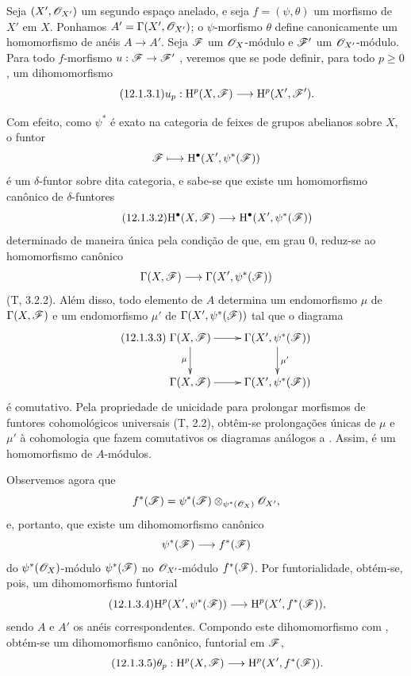 \begin{env}[12.1.3]
\label{0.12.1.3}
Seja $(X',\mathscr{O}_{X'})$ um segundo espaço anelado, e seja
$f=(\psi,\theta)$ um morfismo de $X'$ em $X$.
Ponhamos $A'=\Gamma(X',\mathscr{O}_{X'})$; o $\psi$-morfismo $\theta$
define canonicamente um homomorfismo de anéis $A\to A'$.
Seja $\mathscr{F}$ um $\mathscr{O}_X$-módulo e $\mathscr{F}'$ um
$\mathscr{O}_{X'}$-módulo.
Para todo $f$-morfismo $u:\sh{F}\to\sh{F}'$
, veremos que se pode definir,
para todo $p\geq0$, um dihomomorfismo
\[
\label{0.12.1.3.1}
\tag{12.1.3.1}
  u_p:\HH^p(X,\sh{F})\longrightarrow\HH^p(X',\sh{F}').
\]

Com efeito, como $\psi^*$ é exato na categoria de feixes de grupos
abelianos sobre $X$, o funtor
\[
  \mathscr{F}\longmapsto\mathrm{H}^\bullet(X',\psi^*(\mathscr{F}))
\]
é um $\delta$-funtor sobre dita categoria, e sabe-se que existe um
homomorfismo canônico de $\delta$-funtores
\[
\label{0.12.1.3.2}
\tag{12.1.3.2}
  \HH^\bullet(X,\sh{F})
  \longrightarrow
  \HH^\bullet(X',\psi^*(\sh{F}))
\]
determinado de maneira única pela condição de que, em grau $0$, reduz-se
ao homomorfismo canônico
\[
  \Gamma(X,\mathscr{F})
  \longrightarrow
  \Gamma(X',\psi^*(\mathscr{F}))
\]
(T, 3.2.2).
Além disso, todo elemento de $A$ determina um endomorfismo $\mu$ de
$\Gamma(X,\mathscr{F})$ e um endomorfismo $\mu'$ de
$\Gamma(X',\psi^*(\mathscr{F}))$ tal que o diagrama
\[
\label{0.12.1.3.3}
\tag{12.1.3.3}
  \xymatrix{
    \Gamma(X,\sh{F})\ar[r]\ar[d]_\mu
      & \Gamma(X',\psi^*(\sh{F}))\ar[d]^{\mu'}\\
    \Gamma(X,\sh{F})\ar[r]
      & \Gamma(X',\psi^*(\sh{F}))
  }
\]
é comutativo.
Pela propriedade de unicidade para prolongar morfismos de funtores
cohomológicos universais (T, 2.2), obtêm-se prolongações únicas de
$\mu$ e $\mu'$ à cohomologia que fazem comutativos os diagramas
análogos a .
Assim,  é um homomorfismo de $A$-módulos.

Observemos agora que
\[
  f^*(\mathscr{F})
  =
  \psi^*(\mathscr{F})
  \otimes_{\psi^*(\mathscr{O}_X)}
  \mathscr{O}_{X'},
\]
e, portanto, que existe um dihomomorfismo canônico
\[
  \psi^*(\mathscr{F})\longrightarrow f^*(\mathscr{F})
\]
do $\psi^*(\mathscr{O}_X)$-módulo $\psi^*(\mathscr{F})$ no
$\mathscr{O}_{X'}$-módulo $f^*(\mathscr{F})$.
Por funtorialidade, obtém-se, pois, um dihomomorfismo funtorial
\[
\label{0.12.1.3.4}
\tag{12.1.3.4}
  \HH^p(X',\psi^*(\sh{F}))
  \longrightarrow
  \HH^p(X',f^*(\sh{F})),
\]
sendo $A$ e $A'$ os anéis correspondentes.
Compondo este dihomomorfismo com , obtém-se um
dihomomorfismo canônico, funtorial em $\mathscr{F}$,
\[
\label{0.12.1.3.5}
\tag{12.1.3.5}
  \theta_p:\HH^p(X,\sh{F})
  \longrightarrow
  \HH^p(X',f^*(\sh{F})).
\]


\end{env}
